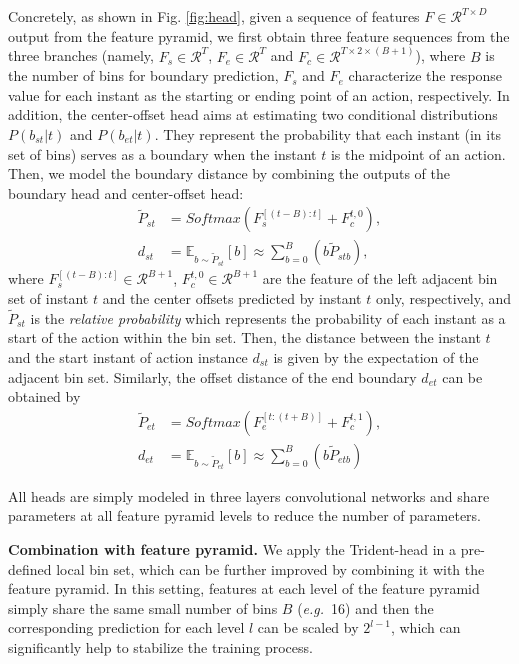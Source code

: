 \documentclass[10pt,twocolumn,letterpaper]{article}
\def\eg{{\em e.g.}}
\newcommand{\figref}[1]{Fig. \ref{#1}}
\newcommand{\myPara}[1]{\vspace{.05in}\noindent\textbf{#1}}
\newcommand{\mc}[1]{\mathcal{#1}}
\newcommand{\mb}[1]{\mathbb{#1}}
\begin{document}
Concretely, as shown in \figref{fig:head}, given a sequence of features $F\in\mc{R}^{T \times D}$ output from the feature pyramid, we first obtain three feature sequences from the three branches (namely, $F_{s} \in \mc{R}^{T}$, $F_{e} \in \mc{R}^{T}$ and $F_{c} \in \mc{R}^{T \times 2 \times (B+1)}$), where $B$ is the number of bins for boundary prediction, $F_{s}$ and $F_{e}$ characterize the response value for each instant as the starting or ending point of an action, respectively. In addition, the center-offset head aims at estimating two conditional distributions $P(b_{st}|t)$ and $P(b_{et}|t)$. They represent the probability that each instant (in its set of bins) serves as a boundary when the instant $t$ is the midpoint of an action. Then, we model the boundary distance by combining the outputs of the boundary head and center-offset head: 
\begin{align}
    \widetilde{P}_{st} &= Softmax(F_{s}^{[(t-B):t]} + F_{c}^{t,0}),\\
    d_{st} &= \mb{E}_{b\sim \widetilde{P}_{st}}[b] \approx \sum_{b=0}^B(b\widetilde{P}_{stb}),
\end{align}
where $F_{s}^{[(t-B):t]} \in \mc{R}^{B+1}$, $F_{c}^{t,0} \in \mc{R}^{B+1}$ are the feature of the left adjacent bin set of instant $t$ and the center offsets predicted by instant $t$ only, respectively, and $\widetilde{P}_{st}$ is the \emph{relative probability} which represents the probability of each instant as a start of the action within the bin set. Then, the distance between the instant $t$ and the start instant of action instance $d_{st}$ is given by the expectation of the adjacent bin set. Similarly, the offset distance of the end boundary $d_{et}$ can be obtained by
\begin{align}
    \widetilde{P}_{et} &= Softmax(F_{e}^{[t:(t+B)]} + F_{c}^{t,1}),\\
    d_{et} &= \mb{E}_{b\sim \widetilde{P}_{et}}[b] \approx \sum_{b=0}^B(b\widetilde{P}_{etb\textbf{}})
\end{align}

All heads are simply modeled in three layers convolutional networks and share parameters at all feature pyramid levels to reduce the number of parameters.

\myPara{Combination with feature pyramid.} 
We apply the Trident-head in a pre-defined local bin set, which can be further improved by combining it with the feature pyramid.
In this setting, features at each level of the feature pyramid simply share the same small number of bins $B$ (\eg~16) and then the corresponding prediction for each level $l$ can be scaled by $2^{l-1}$, which can significantly help to stabilize the training process. 
\end{document}
